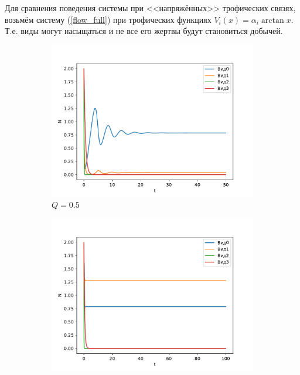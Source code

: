     Для сравнения поведения системы при <<напряжённых>> трофических связях, возьмём систему (\ref{flow_full}) при трофических функциях \( V_i(x) = \alpha_i \arctan x  \). Т.е. виды могут насыщаться и не все его жертвы будут становиться добычей.
    

    \begin{figure}[H]
        \centering
        \begin{subfigure}[t]{.3\linewidth}
            \centering
            \includegraphics[width=\textwidth]{pictures/exp_flow/exp2_Q05.pdf}
            \caption{\(Q = 0.5\)}
        \end{subfigure}
        \begin{subfigure}[t]{.3\linewidth}
            \centering
            \includegraphics[width=\textwidth]{pictures/exp_flow/exp2_Q17.pdf}

\end{subfigure}
\end{figure}

